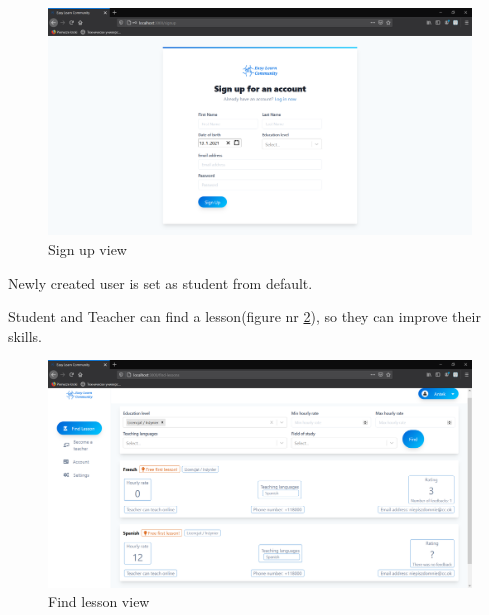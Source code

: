 \begin{figure}[H]
    \centering
    \includegraphics[width=\textwidth]{Include/Resources/Frontend/SignUp.png}
    \caption{Sign up view} 
    \label{fig:SignUp}
\end{figure}

Newly created user is set as student from default.

Student and Teacher can find a lesson(figure nr \ref{fig:FindLesson}), so they can improve their skills.

\begin{figure}[H]
    \centering
    \includegraphics[width=\textwidth]{Include/Resources/Frontend/FindLesson.png}
    \caption{Find lesson view} 
    \label{fig:FindLesson}
\end{figure}

